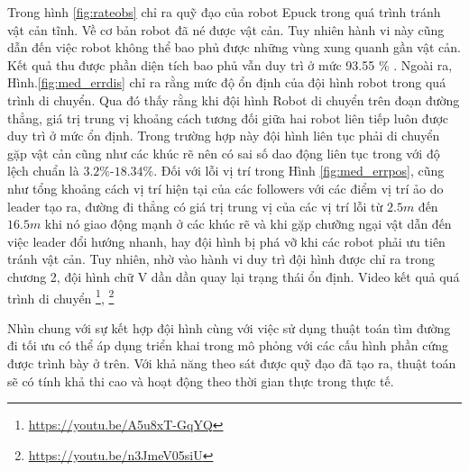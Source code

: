 Trong hình \ref{fig:rateobs} chỉ ra quỹ đạo của robot Epuck trong quá trình tránh vật cản tĩnh. Về cơ bản robot đã né được vật cản. Tuy nhiên hành vi này cũng dẫn đến việc robot không thể bao phủ được những vùng xung quanh gần vật cản. Kết quả thu được phần diện tích bao phủ vẫn duy trì ở mức 93.55 $\%$ . Ngoài ra, Hình.\ref{fig:med_errdis} chỉ ra rằng mức độ ổn định của đội hình robot trong quá trình di chuyển. Qua đó thấy rằng khi đội hình Robot di chuyển trên đoạn đường thẳng, giá trị trung vị khoảng cách tương đối giữa hai robot liên tiếp luôn được duy trì ở mức ổn định. Trong trường hợp này đội hình liên tục phải di chuyển gặp vật cản cũng như các khúc rẽ nên có sai số dao động liên tục trong với độ lệch chuẩn là  $3.2\%$-$18.34\%$. Đối với lỗi vị trí trong Hình \ref{fig:med_errpos}, cũng như tổng khoảng cách vị trí hiện tại của các followers với các điểm vị trí ảo do leader tạo ra, đường đi thẳng có giá trị trung vị của các vị trí lỗi từ $2.5 m$ đến $16.5m $  khi nó giao động mạnh ở các khúc rẽ và khi gặp chưỡng ngại vật dẫn đến việc leader đổi hướng nhanh, hay đội hình bị phá vỡ khi các robot phải ưu tiên tránh vật cản. Tuy nhiên, nhờ vào hành vi duy trì đội hình được chỉ ra trong chương 2, đội hình chữ V dần dần quay lại trạng thái ổn định. Video kết quả quá trình di chuyển \footnote{\url{https://youtu.be/A5u8xT-GqYQ}}, 
\footnote{\url{https://youtu.be/n3JmeV05siU}}

 Nhìn chung với sự kết hợp đội hình cùng với việc sử dụng thuật toán tìm đường đi tối ưu có thể áp dụng triển khai trong mô phỏng với các cấu hình phần cứng được trình bày ở trên. Với khả năng theo sát được quỹ đạo đã tạo ra, thuật toán sẽ có tính khả thi cao và hoạt động theo thời gian thực trong thực tế.


